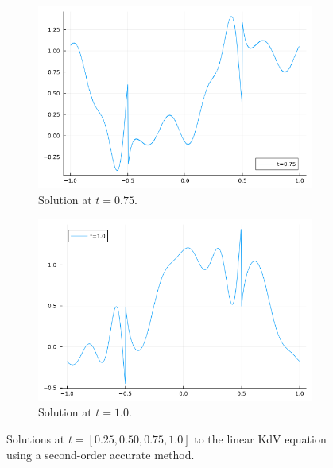 \documentclass[12pt]{report}
\begin{document}
\begin{solution}
\begin{enumerate}
\begin{figure}[H]
\begin{subfigure}[b]{0.45\linewidth}
                \centering
                \includegraphics[width=\linewidth]{images/1-3.png}
                \caption{Solution at $t=0.75$.}
                \label{fig1:c}
                \vspace{4ex}
            \end{subfigure}%
            \begin{subfigure}[b]{0.45\linewidth}
                \centering
                \includegraphics[width=\linewidth]{images/1-4.png}
                \caption{Solution at $t=1.0$.}
                \label{fig1:d}
                \vspace{4ex}
            \end{subfigure}
            \caption{Solutions at $t=[0.25,0.50,0.75,1.0]$ to the linear KdV equation using a second-order accurate method.}
            \label{fig1}
        \end{figure}    



\end{enumerate}
\end{solution}
\end{document}
